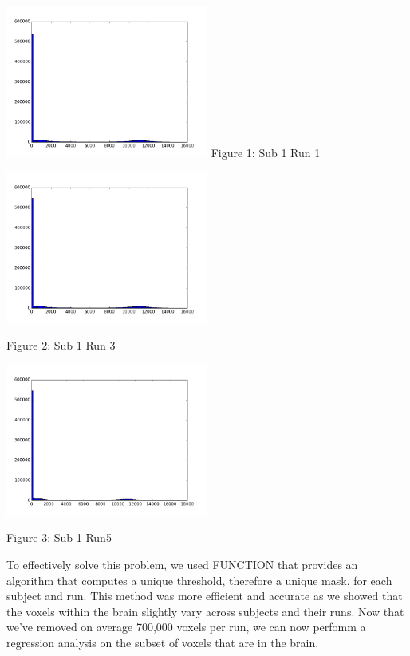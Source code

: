 \documentclass[12pt]{article}
\begin{document}
\begin{housevseverything}
    \centering
      \includegraphics[width=0.5\textwidth]{sub1_run1_mask}
Figure 1: Sub 1 Run 1

 
\end{housevseverything}

\begin{housevseverything}
    \centering
      \includegraphics[width=0.5\textwidth]{sub1_run3_mask.png}
      \caption{Figure 2: Sub 1 Run 3}

\end{housevseverything}

\begin{housevseverything}
    \centering
      \includegraphics[width=0.5\textwidth]{sub1_run5_mask.png}
      \caption{Figure 3: Sub 1 Run5}

\end{housevseverything}


To effectively solve this problem, we used FUNCTION that provides an algorithm 
that computes a unique threshold, therefore a unique mask, for each subject and 
run. This method was more efficient and accurate as we showed that the voxels 
within the brain slightly vary  across subjects and their runs. Now that we've removed on average 700,000 voxels per run, 
we can now perfomm a regression analysis on the subset of voxels that are in 
the brain.    
          
\end{document}
